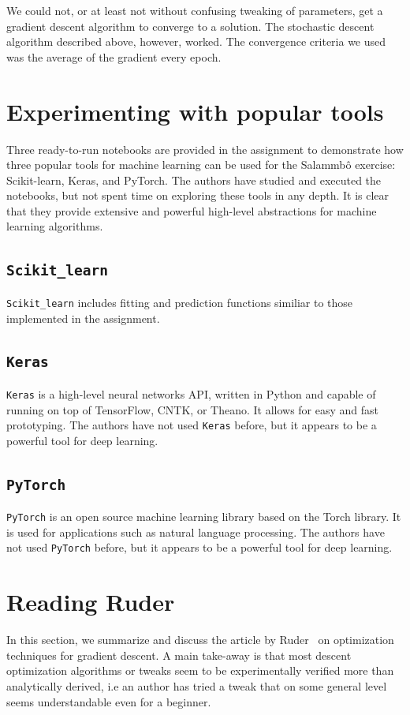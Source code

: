 \documentclass[a4paper]{article}
\begin{document}
We could not, or at least not without confusing tweaking of parameters, get a gradient descent algorithm to converge to a solution. The stochastic descent algorithm described above, however, worked. The convergence criteria we used was the average of the gradient every epoch.

\section{Experimenting with popular tools}
Three ready-to-run notebooks are provided in the assignment to demonstrate how three popular tools for machine learning can be used for the Salammbô exercise: Scikit-learn, Keras, and PyTorch. The authors have studied and executed the notebooks, but not spent time on exploring these tools in any depth. It is clear that they provide extensive and powerful high-level abstractions for machine learning algorithms.

\subsection{\texttt{Scikit\_learn}}
\texttt{Scikit\_learn} includes fitting and prediction functions similiar to those implemented in the assignment. 

\subsection{\texttt{Keras}}
\texttt{Keras} is a high-level neural networks API, written in Python and capable of running on top of TensorFlow, CNTK, or Theano. It allows for easy and fast prototyping. The authors have not used \texttt{Keras} before, but it appears to be a powerful tool for deep learning.

\subsection{\texttt{PyTorch}}
\texttt{PyTorch} is an open source machine learning library based on the Torch library. It is used for applications such as natural language processing. The authors have not used \texttt{PyTorch} before, but it appears to be a powerful tool for deep learning.



\section{Reading Ruder}

In this section, we summarize and discuss the article by Ruder~\cite{DBLP:journals/corr/Ruder16} on optimization techniques for gradient descent.
A main take-away is that most descent optimization algorithms or tweaks seem to be experimentally verified more than analytically derived, i.e an author has tried a tweak that on some general level seems understandable even for a beginner.
\end{document}
